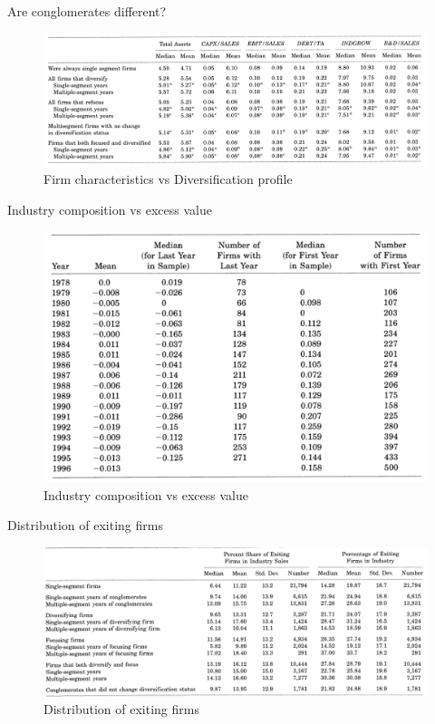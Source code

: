 \documentclass[aspectratio=169,xcolor=dvipsnames]{beamer}
\begin{document}
\begin{frame}{Are conglomerates different?}
    \begin{figure}
        \includegraphics[width=1\linewidth]{figures/table3.png}
        \caption{Firm characteristics vs Diversification profile}
    \end{figure}
\end{frame}

\begin{frame}{Industry composition vs excess value}
    \begin{figure}
        \includegraphics[width=0.7\linewidth]{figures/table4.png}
        \caption{Industry composition vs excess value}
    \end{figure}
\end{frame}

\begin{frame}{Distribution of exiting firms}
    \begin{figure}
        \includegraphics[width=1\linewidth]{figures/table5.png}
        \caption{Distribution of exiting firms}
    \end{figure}
\end{frame}
\end{document}
